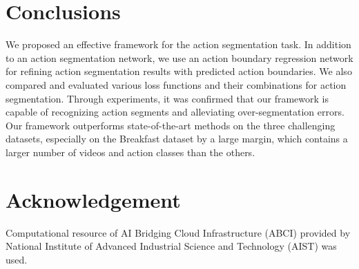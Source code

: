 \documentclass[10pt,twocolumn,letterpaper]{article}
\begin{document}
\vspace{-2pt}
\section{Conclusions}
We proposed an effective framework for the action segmentation task.
In addition to an action segmentation network, we use an action boundary regression network for refining action segmentation results with predicted action boundaries.
We also compared and evaluated various loss functions and their combinations for action segmentation.
Through experiments, it was confirmed that our framework is capable of recognizing action segments and alleviating over-segmentation errors.
Our framework outperforms state-of-the-art methods on the three challenging datasets, especially on the Breakfast dataset by a large margin,
which contains a larger number of videos and action classes than the others.

\section*{Acknowledgement}
Computational resource of AI Bridging Cloud Infrastructure (ABCI) provided by National Institute of Advanced Industrial Science and Technology (AIST) was used.



\end{document}
